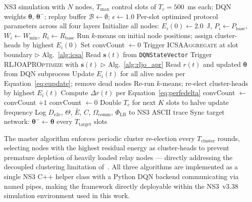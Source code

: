 \documentclass[a4paper]{cas-dc}
\numberwithin{equation}{section}
\begin{document}
\begin{algorithm}[!t]
\caption{ACLIF Master: Closed-Loop Cross-Layer Control}
\label{alg:aclif_master}
\begin{algorithmic}[1]\small
\Require NS3 simulation with $N$ nodes, $T_{\max}$ control slots of $T_c = 500$~ms each;\; DQN weights $\boldsymbol{\theta}$, $\boldsymbol{\theta}^-$;\; replay buffer $\mathcal{B} \leftarrow \emptyset$;\; $\epsilon \leftarrow 1.0$
\Ensure Per-slot optimized protocol parameters across all four layers
\State Initialize all nodes: $E_i(0) \leftarrow 2.0$~J, $P_i \leftarrow P_{\text{base}}$, $W_i \leftarrow W_{\min}$, $R_i \leftarrow R_{\text{base}}$
\State Run $k$-means on initial node positions; assign cluster-heads by highest $E_i(0)$
\State Set convCount $\leftarrow 0$
    \State Trigger \textsc{ICSAAggregate} at slot boundary \hfill $\triangleright$ Alg.~\ref{alg:icsa}
    \State Read $\mathbf{s}(t)$ from \texttt{DQNStateVector}
    \State Trigger \textsc{RLJOAPROptimize} with $\mathbf{s}(t)$ \hfill $\triangleright$ Alg.~\ref{alg:rljo_apr}
    \State Read $r(t)$ and updated $\boldsymbol{\theta}$ from DQN subprocess
    \State Update $E_i(t)$ for all alive nodes per Equation~\ref{eq:eupdate}; remove dead nodes
        \State Re-run $k$-means; re-elect cluster-heads by highest $E_i(t)$
    \EndIf
    \State Compute $\Delta r(t)$ per Equation~\ref{eq:perfedelta}
        \State convCount $\leftarrow$ convCount $+ 1$
    \Else
        \State convCount $\leftarrow 0$
    \EndIf
        \State Double $T_c$ for next $K$ slots to halve update frequency
    \EndIf
    \State Log $D_{\text{e2e}}$, $\Theta$, $\bar{E}$, $C$, $\Omega_{\text{comm}}$, $\Phi_{\text{LB}}$ to NS3 ASCII trace
    \State Sync target network: $\boldsymbol{\theta}^- \leftarrow \boldsymbol{\theta}$ every $T_{\text{target}}$ slots
\EndFor
\end{algorithmic}
\end{algorithm}

The master algorithm enforces periodic cluster re-election every $T_{\text{cluster}}$ rounds, selecting nodes with the highest residual energy as cluster-heads to prevent premature depletion of heavily loaded relay nodes --- directly addressing the decoupled clustering limitation of~\cite{Chaurasiya202325941}. All three algorithms are implemented as a single NS3 C++ helper class with a Python DQN backend communicating via named pipes, making the framework directly deployable within the NS3~v3.38 simulation environment used in this work.
\end{document}
